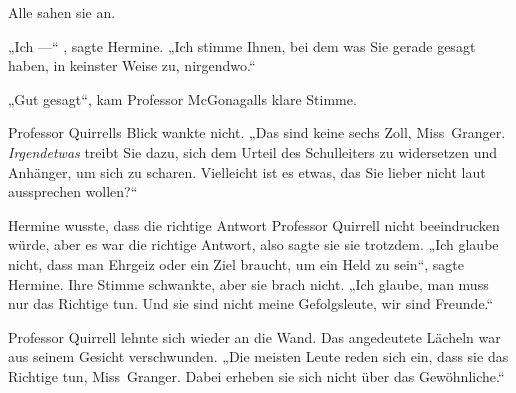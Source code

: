 Alle sahen sie an.

„Ich —“ , sagte Hermine.
„Ich stimme Ihnen, bei dem was Sie gerade gesagt haben, in keinster Weise zu, nirgendwo.“

„Gut gesagt“, kam Professor McGonagalls klare Stimme.

Professor Quirrells Blick wankte nicht.
„Das sind keine sechs Zoll, Miss~Granger. \emph{Irgendetwas} treibt Sie dazu, sich dem Urteil des Schulleiters zu widersetzen und Anhänger, um sich zu scharen. Vielleicht ist es etwas, das Sie lieber nicht laut aussprechen wollen?“

Hermine wusste, dass die richtige Antwort Professor Quirrell nicht beeindrucken würde, aber es war die richtige Antwort, also sagte sie sie trotzdem.
„Ich glaube nicht, dass man Ehrgeiz oder ein Ziel braucht, um ein Held zu sein“, sagte Hermine. Ihre Stimme schwankte, aber sie brach nicht.
„Ich glaube, man muss nur das Richtige tun. Und sie sind nicht meine Gefolgsleute, wir sind Freunde.“

Professor Quirrell lehnte sich wieder an die Wand. Das angedeutete Lächeln war aus seinem Gesicht verschwunden.
„Die meisten Leute reden sich ein, dass sie das Richtige tun, Miss~Granger. Dabei erheben sie sich nicht über das Gewöhnliche.“

